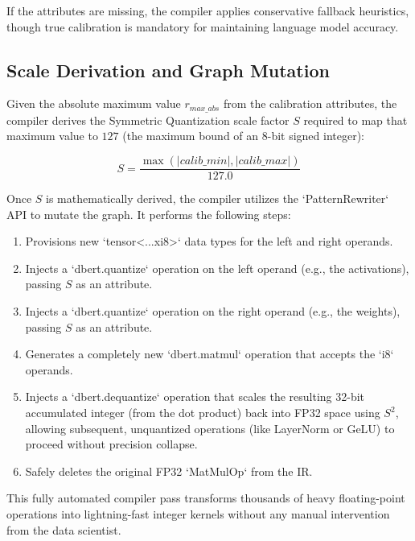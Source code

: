 If the attributes are missing, the compiler applies conservative fallback heuristics, though true calibration is mandatory for maintaining language model accuracy.

\subsection{Scale Derivation and Graph Mutation}
Given the absolute maximum value $r_{max\_abs}$ from the calibration attributes, the compiler derives the Symmetric Quantization scale factor $S$ required to map that maximum value to $127$ (the maximum bound of an 8-bit signed integer):

\begin{equation}
S = \frac{\max(|calib\_min|, |calib\_max|)}{127.0}
\end{equation}

Once $S$ is mathematically derived, the compiler utilizes the `PatternRewriter` API to mutate the graph. It performs the following steps:
\begin{enumerate}
    \item Provisions new `tensor<...xi8>` data types for the left and right operands.
    \item Injects a `dbert.quantize` operation on the left operand (e.g., the activations), passing $S$ as an attribute.
    \item Injects a `dbert.quantize` operation on the right operand (e.g., the weights), passing $S$ as an attribute.
    \item Generates a completely new `dbert.matmul` operation that accepts the `i8` operands.
    \item Injects a `dbert.dequantize` operation that scales the resulting 32-bit accumulated integer (from the dot product) back into FP32 space using $S^2$, allowing subsequent, unquantized operations (like LayerNorm or GeLU) to proceed without precision collapse.
    \item Safely deletes the original FP32 `MatMulOp` from the IR.
\end{enumerate}

This fully automated compiler pass transforms thousands of heavy floating-point operations into lightning-fast integer kernels without any manual intervention from the data scientist.
